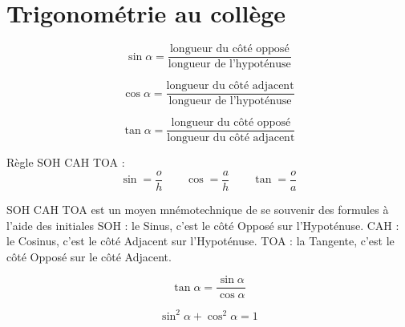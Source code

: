\documentclass[10pt,class=article,crop=false]{standalone}
\begin{document}
\section{Trigonométrie au collège}

\begin{multicols}{2}
	

$$
\sin \alpha = \frac{\text{longueur du côté opposé}}{\text{longueur de l'hypoténuse}}
$$

$$ 
\cos \alpha = \frac{\text{longueur du côté adjacent}}{\text{longueur de l'hypoténuse}}
$$

$$
\tan \alpha = \frac{\text{longueur du côté opposé}}{\text{longueur du côté adjacent}}
$$


Règle \og{}SOH CAH TOA\fg{} : 
$$
\sin = \frac{o}{h} \qquad 
\cos = \frac{a}{h} \qquad 
\tan = \frac{o}{a}
$$

\og{}SOH CAH TOA\fg{} est un moyen mnémotechnique de se souvenir des formules à l'aide des initiales
\og{}SOH\fg{} : le Sinus, c'est le côté Opposé sur l'Hypoténuse.
\og{}CAH\fg{} : le Cosinus, c'est le côté Adjacent sur l'Hypoténuse.
\og{}TOA\fg{} : la Tangente, c'est le côté Opposé sur le côté Adjacent.

$$\tan \alpha = \frac{\sin \alpha}{\cos \alpha}$$

$$\sin^2 \alpha + \cos^2 \alpha = 1$$

\end{multicols}
	
\end{document}
